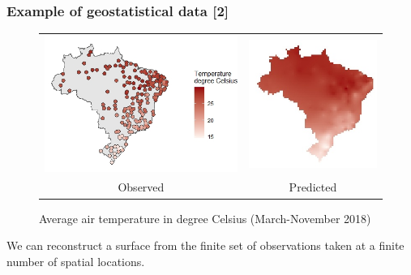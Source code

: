\documentclass[12pt]{beamer}
\begin{document}
\begin{frame}
\frametitle{Example of geostatistical data [2]}
\begin{figure}
\begin{center}
\begin{tabular}{cc}
\includegraphics[width=6.5cm]{Rplot_Temp_Dry2018.jpeg}&
\includegraphics[width=4.3cm]{Rplot_Temp_Pred_Dry2018.jpeg}\\
Observed & Predicted \\
\end{tabular}
\end{center}
\footnotesize{\caption{Average air temperature in degree Celsius (March-November 2018)}}
\end{figure}
\footnotesize{We can reconstruct a surface from the finite set of observations taken at a finite number of spatial locations.}
\end{frame}

\end{document}
